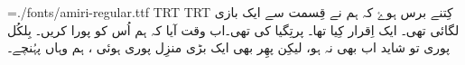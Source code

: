 \nopagenumbers
\parindent=0mm
\font\amiri={./fonts/amiri-regular.ttf}
\textdir TRT
\pardir TRT
\amiri
کِتنے برس ہوۓ کہ ہم نے قِسمت سے ایک بازی لگائی تھی۔ ایک اِقرار کِیا تھا۔ پرتِگیا کی تھی۔اب وقت آیا کہ ہم اُس کو پورا کریں۔ بِلکُل پوری تو شاید اب بھی نہ ہو، لیکِن پھِر بھی ایک بڑی منزِل پوری ہوئی ، ہم وہاں پہُنچے۔
\bye